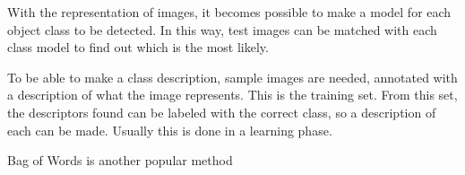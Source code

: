


With the representation of images, it becomes possible to make a model for each object class to be detected. In this way, test images can be matched with each class model to find out which is the most likely.

To be able to make a class description, sample images are needed, annotated with a description of what the image represents. This is the training set. From this set, the descriptors found can be labeled with the correct class, so a description of each can be made. Usually this is done in a learning phase.


Bag of Words is another popular method \cite{lazebnik2006beyond, van2011exploiting} 


